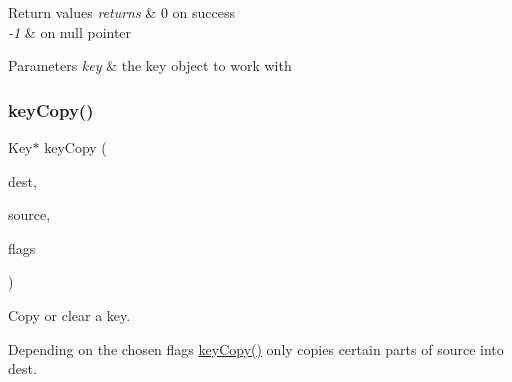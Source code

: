 \begin{DoxyRetVals}{Return values}
{\em returns} & 0 on success \\
\hline
{\em -\/1} & on null pointer\\
\hline
\end{DoxyRetVals}

\begin{DoxyParams}{Parameters}
{\em key} & the key object to work with \\
\hline
\end{DoxyParams}
\mbox{\label{group__key_ga505575ebef060066984fe0f590081e37}} 
\subsubsection{\texorpdfstring{key\+Copy()}{keyCopy()}}
{\footnotesize\ttfamily Key$\ast$ key\+Copy (\begin{DoxyParamCaption}\item[{Key $\ast$}]{dest,  }\item[{const Key $\ast$}]{source,  }\item[{\hyperlink{group__key_ga9ff42b1e9a97222562bfda3dd1f8c735}{elektra\+Copy\+Flags}}]{flags }\end{DoxyParamCaption})}



Copy or clear a key. 

Depending on the chosen {\ttfamily flags} \hyperlink{group__key_ga505575ebef060066984fe0f590081e37}{key\+Copy()} only copies certain parts of {\ttfamily source} into {\ttfamily dest}.


